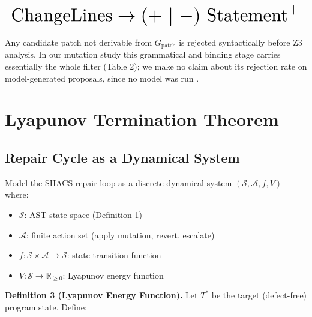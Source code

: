 \documentclass[10pt,twocolumn,letterpaper]{article}
\begin{document}
\begin{equation}
\resizebox{\columnwidth}{!}{$\displaystyle
\begin{aligned}
\text{ChangeLines} \rightarrow (+\ |\ -)\ \text{Statement}^+
\end{aligned}
$}
\end{equation}
























Any candidate patch not derivable from $G_{\text{patch}}$ is rejected syntactically before Z3 analysis. In our mutation study this grammatical and binding stage carries essentially the whole filter (Table 2); we make no claim about its rejection rate on model-generated proposals, since no model was run \cite{crossref_10_18653_v1_2026_findings_acl_1933}.




\section{Lyapunov Termination Theorem}



\subsection{Repair Cycle as a Dynamical System}


Model the SHACS repair loop as a discrete dynamical system $(\mathcal{S}, \mathcal{A}, f, V)$ where:
\begin{itemize}
  \item $\mathcal{S}$: AST state space (Definition 1)
  \item $\mathcal{A}$: finite action set (apply mutation, revert, escalate)
  \item $f: \mathcal{S} \times \mathcal{A} \rightarrow \mathcal{S}$: state transition function
  \item $V: \mathcal{S} \rightarrow \mathbb{R}_{\geq 0}$: Lyapunov energy function
\end{itemize}

\textbf{Definition 3 (Lyapunov Energy Function).} Let $T^*$ be the target (defect-free) program state. Define:
\end{document}

